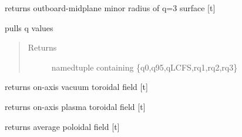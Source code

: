 \documentclass[letterpaper,10pt,english]{sphinxmanual}
\begin{document}
\begin{fulllineitems}
\begin{fulllineitems}
\end{fulllineitems}


\begin{fulllineitems}
\label{eqtools:eqtools.EFIT.EFITTree.getQ3Surf}
returns outboard-midplane minor radius of q=3 surface {[}t{]}

\end{fulllineitems}


\begin{fulllineitems}
\label{eqtools:eqtools.EFIT.EFITTree.getQs}
pulls q values
\begin{quote}\begin{description}
\item[{Returns}] \leavevmode
namedtuple containing \{q0,q95,qLCFS,rq1,rq2,rq3\}

\end{description}\end{quote}

\end{fulllineitems}


\begin{fulllineitems}
\label{eqtools:eqtools.EFIT.EFITTree.getBtVac}
returns on-axis vacuum toroidal field {[}t{]}

\end{fulllineitems}


\begin{fulllineitems}
\label{eqtools:eqtools.EFIT.EFITTree.getBtPla}
returns on-axis plasma toroidal field {[}t{]}

\end{fulllineitems}


\begin{fulllineitems}
\label{eqtools:eqtools.EFIT.EFITTree.getBpAvg}
returns average poloidal field {[}t{]}


\end{fulllineitems}
\end{fulllineitems}
\end{document}
